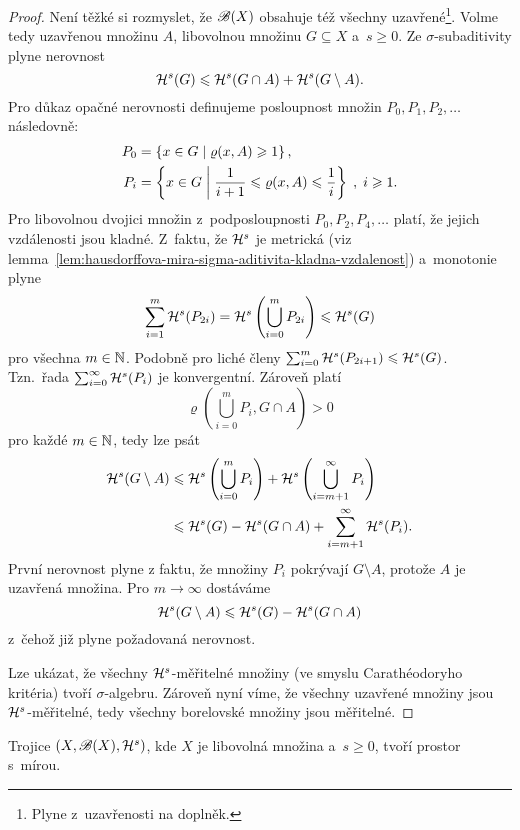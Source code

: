 \begin{proof}
    Není těžké si rozmyslet, že $\mathscr{B}(X)$ obsahuje též všechny uzavřené\footnote{Plyne z~uzavřenosti na doplněk.}. Volme tedy uzavřenou množinu $A$, libovolnou množinu $G\subseteq X$ a~$s\geqslant 0$. Ze $\sigma$-subaditivity plyne nerovnost
    \[\mathcal{H}^{s}(G)\leqslant\mathcal{H}^{s}(G\cap A)+\mathcal{H}^{s}(G\setminus A).\]
    Pro důkaz opačné nerovnosti definujeme posloupnost množin $P_0,P_1,P_2,\ldots$ následovně:
    \begin{align*}
        P_0&=\left\{x\in G\mid\varrho(x,A)\geqslant 1\right\},\\
        P_i&=\left\{x\in G\;\middle|\;\dfrac{1}{i+1}\leqslant\varrho(x,A)\leqslant\dfrac{1}{i}\right\}\;,\;i\geqslant 1.
    \end{align*}
    Pro libovolnou dvojici množin z~podposloupnosti $P_0,P_2,P_4,\ldots$ platí, že jejich vzdálenosti jsou kladné. Z~faktu, že $\mathcal{H}^{s}$ je metrická (viz lemma~\ref{lem:hausdorffova-mira-sigma-aditivita-kladna-vzdalenost}) a~monotonie plyne
    \[\sum_{i=1}^{m}\mathcal{H}^{s}(P_{2i})=\mathcal{H}^{s}\left(\bigcup_{i=0}^m P_{2i}\right)\leqslant\mathcal{H}^{s}(G)\]
    pro všechna $m\in\mathbb{N}$. Podobně pro liché členy $\sum_{i=0}^{m}\mathcal{H}^{s}(P_{2i+1})\leqslant\mathcal{H}^{s}(G)$. Tzn.~řada $\sum_{i=0}^{\infty}\mathcal{H}^{s}(P_i)$ je konvergentní. Zároveň platí
    \[\varrho\left(\bigcup_{i=0}^m P_i,G\cap A\right)>0\]
    pro každé $m\in\mathbb{N}$, tedy lze psát
    \begin{align*}
        \mathcal{H}^{s}(G\setminus A)&\leqslant\mathcal{H}^{s}\left(\bigcup_{i=0}^m P_i\right)+\mathcal{H}^{s}\left(\bigcup_{i=m+1}^\infty P_i\right)\\
        &\leqslant\mathcal{H}^{s}(G)-\mathcal{H}^{s}(G\cap A)+\sum_{i=m+1}^{\infty}\mathcal{H}^{s}(P_i).
    \end{align*}
    První nerovnost plyne z faktu, že množiny $P_i$ pokrývají $G\setminus A$, protože $A$ je uzavřená množina. Pro $m\to\infty$ dostáváme
    \[\mathcal{H}^{s}(G\setminus A)\leqslant\mathcal{H}^{s}(G)-\mathcal{H}^{s}(G\cap A)\]
    z~čehož již plyne požadovaná nerovnost.

    Lze ukázat, že všechny $\mathcal{H}^{s}$-měřitelné množiny (ve smyslu Carathéodoryho kritéria) tvoří $\sigma$-algebru. Zároveň nyní víme, že všechny uzavřené množiny jsou $\mathcal{H}^{s}$-měřitelné, tedy všechny borelovské množiny jsou měřitelné. 
\end{proof}
\begin{corollary}\label{cor:hausdorffova-mira-je-mira}
    Trojice $(X,\mathscr{B}(X),\mathcal{H}^{s})$, kde $X$ je libovolná množina a~$s\geqslant 0$, tvoří prostor s~mírou.
\end{corollary}


